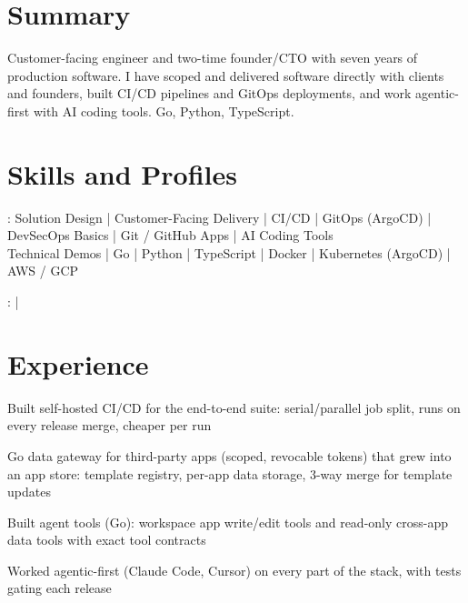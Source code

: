 \documentclass[print]{jack-resume}
\begin{document}
\pagecolor{darkmodeBackground}


\begin{minipage}[t][1cm][t]{.03\textwidth}
    \hfill
\end{minipage}

\section{Summary}
Customer-facing engineer and two-time founder/CTO with seven years of production software. I have scoped and delivered software directly with clients and founders, built CI/CD pipelines and GitOps deployments, and work agentic-first with AI coding tools. Go, Python, TypeScript.
\sectionsep

\section{Skills and Profiles}
:
Solution Design \hfill | \hfill
Customer-Facing Delivery \hfill | \hfill
CI/CD \hfill | \hfill
GitOps (ArgoCD) \hfill | \hfill
DevSecOps Basics \hfill | \hfill
Git / GitHub Apps \hfill | \hfill
AI Coding Tools \\
\hspace{1.0cm} Technical Demos \hfill | \hfill
Go \hfill | \hfill
Python \hfill | \hfill
TypeScript \hfill | \hfill
Docker \hfill | \hfill
Kubernetes (ArgoCD) \hfill | \hfill
AWS / GCP \\

\raggedright{
    :
      \href{https://www.linkedin.com/in/jack-sturtevant/}{ \ExternalLink} |
     \href{https://github.com/jacksturt}{ \ExternalLink}}

\section{Experience}

\begin{tightemize}
    \item Built self-hosted CI/CD for the end-to-end suite: serial/parallel job split, runs on every release merge, cheaper per run
    \item Go data gateway for third-party apps (scoped, revocable tokens) that grew into an app store: template registry, per-app data storage, 3-way merge for template updates
    \item Built agent tools (Go): workspace app write/edit tools and read-only cross-app data tools with exact tool contracts
    \item Worked agentic-first (Claude Code, Cursor) on every part of the stack, with tests gating each release
\end{tightemize}
\sectionsep
\end{document}
